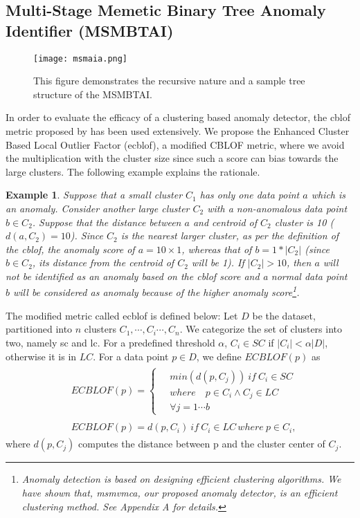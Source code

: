 \documentclass[fleqn,usenatbib]{mnras}
\newtheorem{example}{Example}
\begin{document}
\subsection{Multi-Stage Memetic Binary Tree Anomaly Identifier (MSMBTAI)}\label{sec:msmbtai}

\begin{figure}
  \centering
      \texttt{[image: msmaia.png]}
\caption{This figure demonstrates the recursive nature and a sample tree structure of the MSMBTAI.}
\label{matreelatest}
\centering
 \end{figure}
\noindent In order to evaluate the efficacy of a clustering based anomaly detector, the \acrfull{cblof} metric proposed by \citet{Deng} has been used extensively. We propose the  Enhanced Cluster Based Local Outlier Factor (\acrshort{ecblof}), a modified CBLOF metric, where we avoid the multiplication with the cluster size since such a score can bias towards the large clusters. The following example explains the rationale.
\begin{example}
Suppose that a small cluster $C_1$ has only one data point $a$ which is an anomaly. Consider another large cluster $C_2$ with a non-anomalous data point $b\in C_2$. Suppose that the distance between $a$ and centroid of $C_2$ cluster is 10 ($d(a,C_2)=10$). Since $C_2$ is the nearest larger cluster, as per the definition of the \acrshort{cblof}, the anomaly score of $a=10\times1$, whereas that of $b=1*|C_2|$ (since $b\in C_2$, its distance from the centroid of $C_2$ will be 1). If $|C_2|>10$, then $a$ will not be identified as an anomaly based on the \acrshort{cblof} score and a normal data point $b$ will be considered as anomaly because of the higher anomaly score\footnote{\!\!Anomaly detection is based on designing efficient clustering algorithms. We have shown that, \acrshort{msmvmca}, our proposed anomaly detector, is an efficient clustering method. See Appendix A for details.}. 
\end{example}
The modified metric called \acrshort{ecblof} is defined below:
Let $D$ be the dataset, partitioned into $n$ clusters $C_1,\cdots,C_i\cdots,C_n$. We categorize the set of clusters into two, namely \acrfull{sc} and \acrfull{lc}. For a predefined threshold $\alpha$, $C_i\in SC$ if $|C_i|<\alpha|D|$, otherwise it is in $LC$. 
For a data point $p\in D$, we define $ECBLOF(p)$ as
\begin{align}
     &\begin{aligned}\label{scecblof}
     ECBLOF(p)  =\begin{cases}
             \quad min(d(p,C_j))\ if\ C_i \in SC\\ \quad where \quad p\in C_i \wedge C_j \in LC\\ \quad \forall j=1\cdots b
          \end{cases}
     \end{aligned}\\
     &\begin{aligned}\label{lcecblof}
     ECBLOF(p) = d(p,C_i)\ if\ C_i\in LC\, where\ p\in C_i,
     \end{aligned}
\end{align}
where $d(p, C_j)$ computes the distance between p and the cluster center of $C_j$. 
\end{document}
